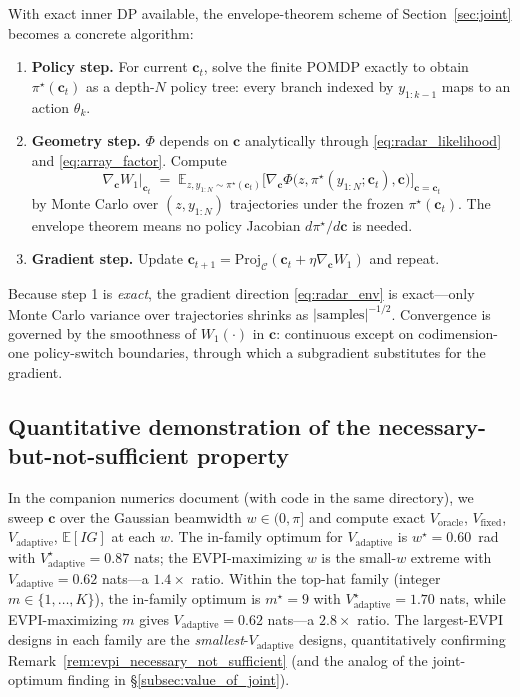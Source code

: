 \documentclass[11pt,a4paper]{article}
\newcommand{\E}{\mathbb{E}}
\begin{document}
With exact inner DP available, the envelope-theorem scheme of Section~\ref{sec:joint} becomes a concrete algorithm:

\begin{enumerate}[nosep, leftmargin=2em]
  \item \textbf{Policy step.}  For current $\bm{c}_t$, solve the finite POMDP exactly to obtain $\pi^\star(\bm{c}_t)$ as a depth-$N$ policy tree: every branch indexed by $y_{1:k-1}$ maps to an action $\theta_k$.
  \item \textbf{Geometry step.}  $\Phi$ depends on $\bm{c}$ analytically through \eqref{eq:radar_likelihood} and \eqref{eq:array_factor}.  Compute
  \begin{equation}
    \nabla_{\bm{c}} W_1\big|_{\bm{c}_t} \;=\; \E_{z, y_{1:N} \sim \pi^\star(\bm{c}_t)}\!\bigl[\nabla_{\bm{c}} \Phi\!\bigl(z, \pi^\star(y_{1:N}; \bm{c}_t), \bm{c}\bigr)\bigr]_{\bm{c} = \bm{c}_t}
    \label{eq:radar_env}
  \end{equation}
  by Monte Carlo over $(z, y_{1:N})$ trajectories under the frozen $\pi^\star(\bm{c}_t)$.  The envelope theorem means no policy Jacobian $d\pi^\star / d\bm{c}$ is needed.
  \item \textbf{Gradient step.}  Update $\bm{c}_{t+1} = \mathrm{Proj}_{\mathcal{C}}(\bm{c}_t + \eta \nabla_{\bm{c}} W_1)$ and repeat.
\end{enumerate}

Because step 1 is \emph{exact}, the gradient direction \eqref{eq:radar_env} is exact---only Monte Carlo variance over trajectories shrinks as $|\text{samples}|^{-1/2}$.  Convergence is governed by the smoothness of $W_1(\cdot)$ in $\bm{c}$: continuous except on codimension-one policy-switch boundaries, through which a subgradient substitutes for the gradient.

\subsection{Quantitative demonstration of the necessary-but-not-sufficient property}

In the companion numerics document (with code in the same directory), we sweep $\bm{c}$ over the Gaussian beamwidth $w \in (0, \pi]$ and compute exact $V_{\mathrm{oracle}}$, $V_{\mathrm{fixed}}$, $V_{\mathrm{adaptive}}$, $\E[IG]$ at each $w$.  The in-family optimum for $V_{\mathrm{adaptive}}$ is $w^\star = 0.60$~rad with $V_{\mathrm{adaptive}}^\star = 0.87$ nats; the EVPI-maximizing $w$ is the small-$w$ extreme with $V_{\mathrm{adaptive}} = 0.62$ nats---a $1.4\times$ ratio.  Within the top-hat family (integer $m \in \{1, \ldots, K\}$), the in-family optimum is $m^\star = 9$ with $V_{\mathrm{adaptive}}^\star = 1.70$ nats, while EVPI-maximizing $m$ gives $V_{\mathrm{adaptive}} = 0.62$ nats---a $2.8\times$ ratio.  The largest-EVPI designs in each family are the \emph{smallest}-$V_{\mathrm{adaptive}}$ designs, quantitatively confirming Remark~\ref{rem:evpi_necessary_not_sufficient} (and the analog of the joint-optimum finding in \S\ref{subsec:value_of_joint}).
\end{document}
